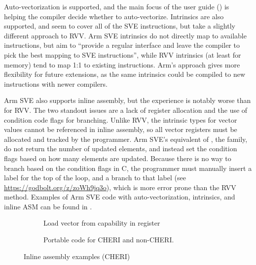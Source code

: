 \documentclass[../thesis]{subfiles}
\begin{document}
Auto-vectorization is supported, and the main focus of the user guide (\cite{armltdArmCompilerScalable2019}) is helping the compiler decide whether to auto-vectorize.
Intrinsics are also supported, and seem to cover all of the SVE instructions, but take a slightly different approach to RVV.
Arm SVE intrinsics do not directly map to available instructions, but aim to \enquote{provide a regular interface and leave the compiler to pick the best mapping to SVE instructions}, while RVV intrinsics (at least for memory) tend to map 1:1 to existing instructions.
Arm's approach gives more flexibility for future extensions, as the same intrinsics could be compiled to new instructions with newer compilers.

Arm SVE also supports inline assembly, but the experience is notably worse than for RVV.
The two standout issues are a lack of register allocation and the use of condition code flags for branching.
Unlike RVV, the intrinsic types for vector values cannot be referenced in inline assembly\cite{stephensARMScalableVector2017}, so all vector registers must be allocated and tracked by the programmer.
Arm SVE's equivalent of , the  family\cite{armltdARMLanguageExtensions2020}, do not return the number of updated elements, and instead set the condition flags based on how many elements are updated.
Because there is no way to branch based on the condition flags in C, the programmer must manually insert a label for the top of the loop, and a branch to that label (see \url{https://godbolt.org/z/zoWh9jq3o}), which is more error prone than the RVV method.
Examples of Arm SVE code with auto-vectorization, intrinsics, and inline ASM can be found in .

\begin{figure}
    \centering
    \begin{subfigure}[t]{0.45\textwidth}
        \caption{Load vector from capability in register}\label{subfig:inline_asm_vector_cap_reg}
    \end{subfigure}\hfill{}
    \begin{subfigure}[t]{0.54\textwidth}
        \centering
        \caption{Portable code for CHERI and non-CHERI.}\label{subfig:inline_asm_vector_portable}
    \end{subfigure}
    \parnotes{}
    \caption{Inline assembly examples (CHERI)}\label{fig:inlineasmcheri}
\end{figure}
\end{document}
